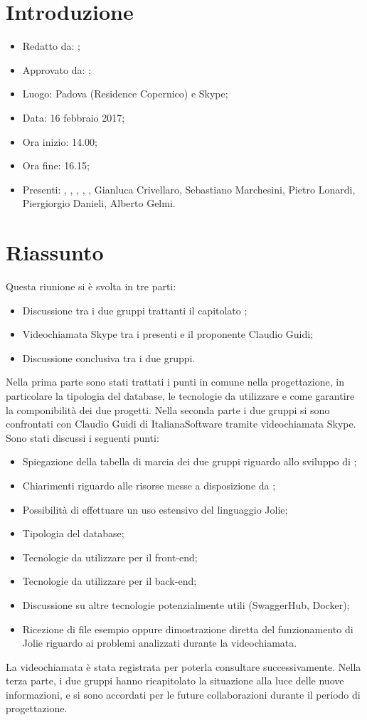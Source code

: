 \section{Introduzione}

	\begin{itemize}
		\item Redatto da: \MC;
		\item Approvato da: \DS;
		\item Luogo: Padova (Residence Copernico) e Skype;
		\item Data: 16 febbraio 2017;
		\item Ora inizio: 14.00;
		\item Ora fine: 16.15;
		\item Presenti: \AN, \DAN, \DS, \MC, \NS, Gianluca Crivellaro, Sebastiano Marchesini, Pietro Lonardi, Piergiorgio Danieli, Alberto Gelmi.
	\end{itemize}

\section{Riassunto}
Questa riunione si è svolta in tre parti:
\begin{itemize}
	\item Discussione tra i due gruppi trattanti il capitolato \progetto;
	\item Videochiamata Skype tra i presenti e il proponente Claudio Guidi;
	\item Discussione conclusiva tra i due gruppi.
\end{itemize}
Nella prima parte sono stati trattati i punti in comune nella progettazione, in particolare la tipologia del database, le tecnologie da utilizzare e come garantire la componibilità dei due progetti.
Nella seconda parte i due gruppi si sono confrontati con Claudio Guidi di ItalianaSoftware tramite videochiamata Skype. Sono stati discussi i seguenti punti:
\begin{itemize}
	\item Spiegazione della tabella di marcia dei due gruppi riguardo allo sviluppo di \progetto;
	\item Chiarimenti riguardo alle risorse messe a disposizione da \proponente;
	\item Possibilità di effettuare un uso estensivo del linguaggio Jolie;
	\item Tipologia del database;
	\item Tecnologie da utilizzare per il front-end;
	\item Tecnologie da utilizzare per il back-end;
	\item Discussione su altre tecnologie potenzialmente utili (SwaggerHub, Docker);
	\item Ricezione di file esempio oppure dimostrazione diretta del funzionamento di Jolie riguardo ai problemi analizzati durante la videochiamata.
\end{itemize}
La videochiamata è stata registrata per poterla consultare successivamente.
Nella terza parte, i due gruppi hanno ricapitolato la situazione alla luce delle nuove informazioni, e si sono accordati per le future collaborazioni durante il periodo di progettazione.